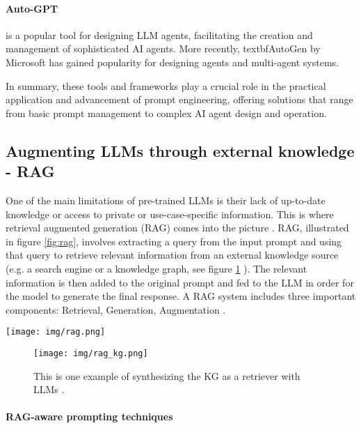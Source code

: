 \documentclass[conference]{IEEEtran}
\begin{document}
\paragraph{Auto-GPT} is a popular tool for designing LLM agents, facilitating the creation and management of sophisticated AI agents. More recently, textbf{AutoGen} by Microsoft has gained popularity for designing agents and multi-agent systems.

In summary, these tools and frameworks play a crucial role in the practical application and advancement of prompt engineering, offering solutions that range from basic prompt management to complex AI agent design and operation.
\fi


\subsection{\textbf{Augmenting LLMs through external knowledge - RAG}}\label{sub:RAG}
One of the main limitations of pre-trained LLMs is their lack of up-to-date knowledge or access to private or use-case-specific information. This is where retrieval augmented generation (RAG) comes into the picture \cite{DBLP:journals/corr/abs-2005-11401}. RAG, illustrated in figure \ref{fig:rag}, involves extracting a query from the input prompt and using that query to retrieve relevant information from an external knowledge source (e.g. a search engine or a knowledge graph, see figure \ref{fig:rag_kg} ). The relevant information is then added to the original prompt and fed to the LLM in order for the model to generate the final response. A RAG system includes three important components: Retrieval, Generation, Augmentation \cite{gao2023retrieval}. 

\begin{figure*}
    \centering
    \texttt{[image: img/rag.png]}
    \caption{An example of synthesizing RAG with LLMs for question answering application \cite{aws-qa-rag-sagemaker}.}
    \label{fig:rag}
\end{figure*}


\begin{figure}
    \centering
    \texttt{[image: img/rag\_kg.png]}
    \caption{This is one example of synthesizing the KG as a retriever with LLMs \cite{pan2023unifying}.}
    \label{fig:rag_kg}
\end{figure}

\paragraph{RAG-aware prompting techniques}
\end{document}
